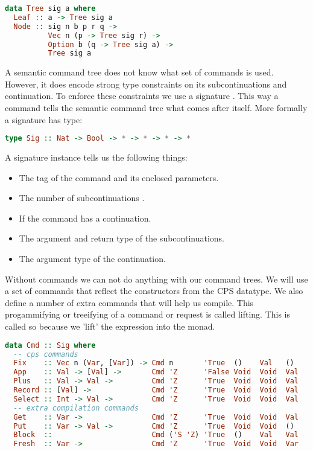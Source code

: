 \begin{lstlisting}[language=Haskell]
data Tree sig a where
  Leaf :: a -> Tree sig a
  Node :: sig n b p r q ->
          Vec n (p -> Tree sig r) ->
          Option b (q -> Tree sig a) ->
          Tree sig a
\end{lstlisting}

A semantic command tree does not know what set of commands is used. However, it does encode strong type constraints on its subcontinuations and continuation. To enforce these constraints we use a signature . This way a command tells the semantic command tree what comes after itself. More formally a signature has type:

\begin{lstlisting}[language=Haskell]
type Sig :: Nat -> Bool -> * -> * -> * -> *
\end{lstlisting}

A signature instance  tells us the following things:

\begin{itemize}
\item The tag of the command and its enclosed parameters.
\item The number of subcontinuations .
\item If the command has a continuation.
\item The argument  and return type  of the subcontinuations.
\item The argument type  of the continuation.
\end{itemize}

Without commands we can not do anything with our command trees. We will use a set of commands that reflect the constructors from the \ac{CPS} datatype. We also define a number of extra commands that will help us compile. This progammifying or treeifying of a command or request is called lifting. This is called so because we 'lift' the expression into the monad.

\begin{lstlisting}[language=Haskell]
data Cmd :: Sig where
  -- cps commands
  Fix    :: Vec n (Var, [Var]) -> Cmd n       'True  ()    Val   ()
  App    :: Val -> [Val] ->       Cmd 'Z      'False Void  Void  Val 
  Plus   :: Val -> Val ->         Cmd 'Z      'True  Void  Void  Val
  Record :: [Val] ->              Cmd 'Z      'True  Void  Void  Val
  Select :: Int -> Val ->         Cmd 'Z      'True  Void  Void  Val
  -- extra compilation commands
  Get    :: Var ->                Cmd 'Z      'True  Void  Void  Val
  Put    :: Var -> Val ->         Cmd 'Z      'True  Void  Void  ()
  Block  ::                       Cmd ('S 'Z) 'True  ()    Val   Val
  Fresh  :: Var ->                Cmd 'Z      'True  Void  Void  Var
\end{lstlisting}

